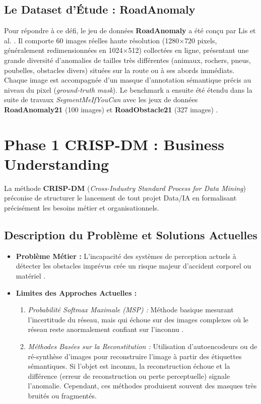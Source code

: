 \documentclass[11pt,a4paper]{article} \usepackage[utf8]{inputenc} \usepackage[T1]{fontenc}
\begin{document}
\subsection{Le Dataset d'Étude : RoadAnomaly}
Pour répondre à ce défi, le jeu de données \textbf{RoadAnomaly} a été conçu par Lis et al.
\cite{lis2019detecting}. Il comporte 60 images réelles haute résolution (1280$\times$720 pixels,
généralement redimensionnées en 1024$\times$512) collectées en ligne, présentant une grande diversité
d'anomalies de tailles très différentes (animaux, rochers, pneus, poubelles, obstacles divers) situées
sur la route ou à ses abords immédiats. Chaque image est accompagnée d'un masque d'annotation sémantique
précis au niveau du pixel (\emph{ground-truth mask}). Le benchmark a ensuite été étendu dans la suite de
travaux \emph{SegmentMeIfYouCan} avec les jeux de données \textbf{RoadAnomaly21} (100 images) et
\textbf{RoadObstacle21} (327 images) \cite{chan2021segmentmeifyoucan}.
\section{Phase 1 CRISP-DM : Business Understanding}
La méthode \textbf{CRISP-DM} (\emph{Cross-Industry Standard Process for Data Mining}) \cite{crispdm2026}
préconise de structurer le lancement de tout projet Data/IA en formalisant précisément les besoins métier
et organisationnels.
\subsection{Description du Problème et Solutions Actuelles}

\begin{itemize} \item \textbf{Problème Métier :} L'incapacité des systèmes de perception actuels à
détecter les obstacles imprévus crée un risque majeur d'accident corporel ou matériel \cite{cav2023,
assignment2026}. \item \textbf{Limites des Approches Actuelles :}
\begin{enumerate} \item \emph{Probabilité Softmax Maximale (MSP) :} Méthode basique mesurant
l'incertitude du réseau, mais qui échoue sur des images complexes où le réseau reste anormalement
confiant sur l'inconnu \cite{zhao2024survey}. \item \emph{Méthodes Basées sur la Reconstitution :}
Utilisation d'autoencodeurs \cite{toyota2024} ou de ré-synthèse d'images \cite{lis2019detecting} pour
reconstruire l'image à partir des étiquettes sémantiques. Si l'objet est inconnu, la reconstruction
échoue et la différence (erreur de reconstruction ou perte perceptuelle) signale l'anomalie. Cependant,
ces méthodes produisent souvent des masques très bruités ou fragmentés.
\end{enumerate}
\end{itemize}
\end{document}
